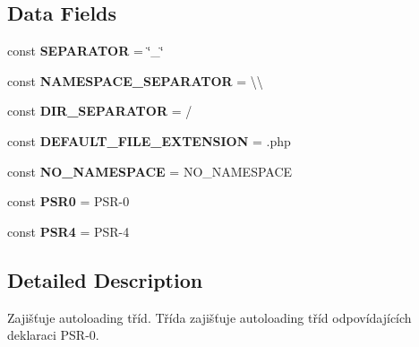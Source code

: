 \subsection*{Data Fields}
\begin{DoxyCompactItemize}
\item 
\mbox{\label{class_autoloader___autoloader_o_l_d_a8e88e16132e9235e0f03b7581e8d4f62}} 
const {\bfseries S\+E\+P\+A\+R\+A\+T\+OR} = \char`\"{}\+\_\+\char`\"{}
\item 
\mbox{\label{class_autoloader___autoloader_o_l_d_a8c3c0358c4ebe21db8aa0ae03e8f9a60}} 
const {\bfseries N\+A\+M\+E\+S\+P\+A\+C\+E\+\_\+\+S\+E\+P\+A\+R\+A\+T\+OR} = \textquotesingle{}\textbackslash{}\textbackslash{}\textquotesingle{}
\item 
\mbox{\label{class_autoloader___autoloader_o_l_d_a4db2b4b3307d4e38977aca27fed025bd}} 
const {\bfseries D\+I\+R\+\_\+\+S\+E\+P\+A\+R\+A\+T\+OR} = \textquotesingle{}/\textquotesingle{}
\item 
\mbox{\label{class_autoloader___autoloader_o_l_d_a610e970d3c0f5f44432638cdbb60f780}} 
const {\bfseries D\+E\+F\+A\+U\+L\+T\+\_\+\+F\+I\+L\+E\+\_\+\+E\+X\+T\+E\+N\+S\+I\+ON} = \textquotesingle{}.php\textquotesingle{}
\item 
\mbox{\label{class_autoloader___autoloader_o_l_d_a20861ea16262bbda1d1a87d9b4b75242}} 
const {\bfseries N\+O\+\_\+\+N\+A\+M\+E\+S\+P\+A\+CE} = \textquotesingle{}N\+O\+\_\+\+N\+A\+M\+E\+S\+P\+A\+CE\textquotesingle{}
\item 
\mbox{\label{class_autoloader___autoloader_o_l_d_af1477dde8ad9e5f370b0ea2e00ebfcd9}} 
const {\bfseries P\+S\+R0} = \textquotesingle{}P\+SR-\/0\textquotesingle{}
\item 
\mbox{\label{class_autoloader___autoloader_o_l_d_a7630d48edca58838bb5a027dd7a26741}} 
const {\bfseries P\+S\+R4} = \textquotesingle{}P\+SR-\/4\textquotesingle{}
\end{DoxyCompactItemize}


\subsection{Detailed Description}
Zajišťuje autoloading tříd. Třída zajišťuje autoloading tříd odpovídajících deklaraci P\+S\+R-\/0. 

